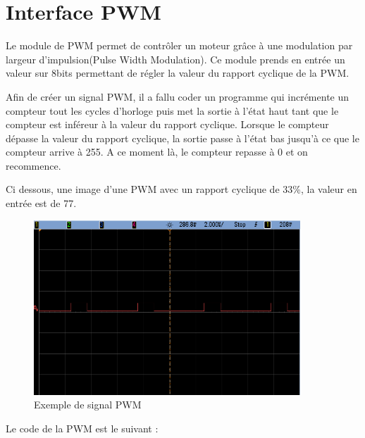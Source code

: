 \section{Interface PWM}
Le module de PWM permet de contrôler un moteur grâce à une modulation par largeur d'impulsion(Pulse Width Modulation). Ce module prends en entrée un valeur sur 8bits permettant de régler la valeur
du rapport cyclique de la PWM.

Afin de créer un signal PWM, il a fallu coder un programme qui incrémente un compteur tout les cycles d'horloge puis met la sortie à l'état haut tant que le compteur est 
inféreur à la valeur du rapport cyclique. Lorsque le compteur dépasse la valeur du rapport cyclique, la sortie passe à l'état bas jusqu'à ce que le compteur arrive à 255. A ce
moment là, le compteur repasse à 0 et on recommence.

Ci dessous, une image d'une PWM avec un rapport cyclique de 33\%, la valeur en entrée est de 77.

\begin{figure}[h]
\centering
\includegraphics[width=10cm]{img/PWM_3F.png}
\caption{Exemple de signal PWM}
\end{figure}

Le code de la PWM est le suivant : 


\pagebreak

